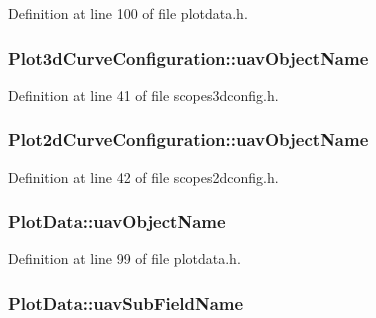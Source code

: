 \-Definition at line 100 of file plotdata.\-h.

\hypertarget{group___scope_plugin_gae997da1be9b0e82a84d8d19292c28984}{
\subsubsection[{uav\-Object\-Name}]{ {\bf \-Plot3d\-Curve\-Configuration\-::uav\-Object\-Name}}}\label{group___scope_plugin_gae997da1be9b0e82a84d8d19292c28984}


\-Definition at line 41 of file scopes3dconfig.\-h.

\hypertarget{group___scope_plugin_gaf7c7f2da1da17096fbffa1fdaa35d30e}{
\subsubsection[{uav\-Object\-Name}]{ {\bf \-Plot2d\-Curve\-Configuration\-::uav\-Object\-Name}}}\label{group___scope_plugin_gaf7c7f2da1da17096fbffa1fdaa35d30e}


\-Definition at line 42 of file scopes2dconfig.\-h.

\hypertarget{group___scope_plugin_ga409edd318f86291f5b46a673ff67e7fb}{
\subsubsection[{uav\-Object\-Name}]{ {\bf \-Plot\-Data\-::uav\-Object\-Name}}}\label{group___scope_plugin_ga409edd318f86291f5b46a673ff67e7fb}


\-Definition at line 99 of file plotdata.\-h.

\hypertarget{group___scope_plugin_ga22ac4a688fa35def44e941b82b0a0b60}{
\subsubsection[{uav\-Sub\-Field\-Name}]{ {\bf \-Plot\-Data\-::uav\-Sub\-Field\-Name}}}\label{group___scope_plugin_ga22ac4a688fa35def44e941b82b0a0b60}


